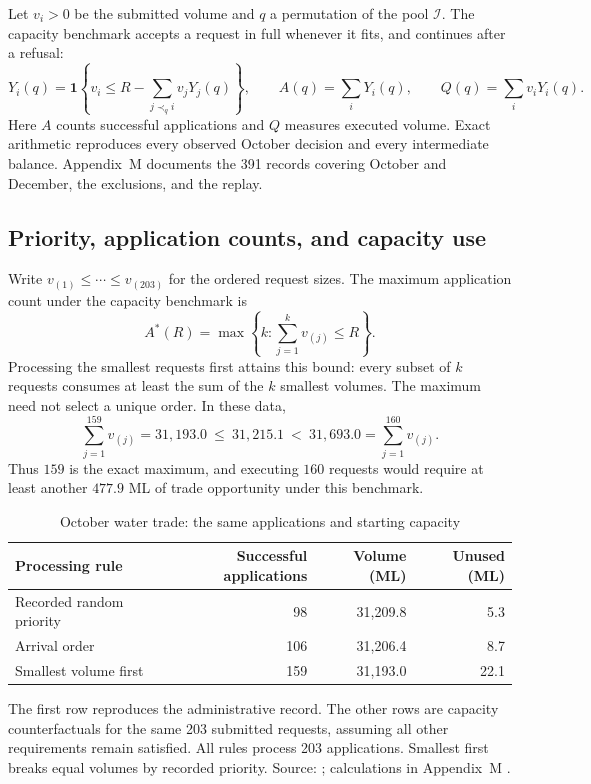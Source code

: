 \documentclass[ecta,draft]{econsocart}
\theoremstyle{definition}
\theoremstyle{definition}
\begin{document}
Let $v_i>0$ be the submitted volume and $q$ a permutation of the pool
$\mathcal I$. The capacity benchmark accepts a request in full whenever it
fits, and continues after a refusal:
\[
 Y_i(q)=\mathbf 1\!\left\{
 v_i\le R-\sum_{j\prec_q i}v_jY_j(q)\right\},\qquad
 A(q)=\sum_iY_i(q),\qquad Q(q)=\sum_i v_iY_i(q).
\]
Here $A$ counts successful applications and $Q$ measures executed volume.
Exact arithmetic reproduces every observed October decision and every
intermediate balance. Appendix~M%
 documents the
391 records covering October and December, the exclusions, and the replay.

\subsection{Priority, application counts, and capacity use}
Write $v_{(1)}\le\cdots\le v_{(203)}$ for the ordered request sizes.
The maximum application count under the capacity benchmark is
\[
 A^*(R)=\max\left\{k:\sum_{j=1}^{k}v_{(j)}\le R\right\}.
\]
Processing the smallest requests first attains this bound: every subset of
$k$ requests consumes at least the sum of the $k$ smallest volumes.
The maximum need not select a unique order. In these data,
\[
 \sum_{j=1}^{159}v_{(j)}=31{,}193.0
 \ \le\ 31{,}215.1
 \ <\ 31{,}693.0=\sum_{j=1}^{160}v_{(j)}.
\]
Thus $159$ is the exact maximum, and executing $160$ requests would require
at least another $477.9$ ML of trade opportunity under this benchmark.

\begin{table}[htbp]
\centering\small
\caption{October water trade: the same applications and starting capacity}
\label{tab:waterqueues}
\begin{tabular}{@{}lrrr@{}}
\toprule
Processing rule & Successful applications & Volume (ML) & Unused (ML)\\
\midrule
Recorded random priority & 98 & 31,209.8 & 5.3\\
Arrival order & 106 & 31,206.4 & 8.7\\
Smallest volume first & 159 & 31,193.0 & 22.1\\
\bottomrule
\end{tabular}
\par\smallskip
\begin{minipage}{\linewidth}\footnotesize
The first row reproduces the administrative record. The other rows are
capacity counterfactuals for the same 203 submitted requests, assuming all
other requirements remain satisfied. All rules process 203 applications.
Smallest first breaks equal volumes by recorded priority. Source:
\citet[Table~5]{DEECA2025October}; calculations in
Appendix~M%
.
\end{minipage}
\end{table}
\end{document}
